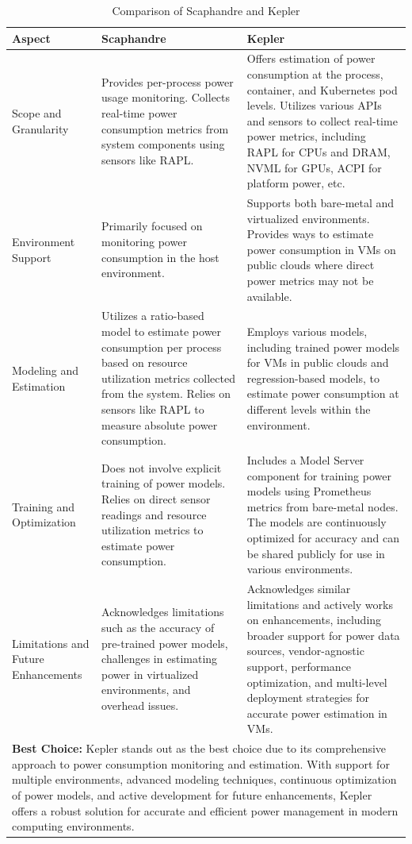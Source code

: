 \begin{table}[htbp]
  \centering
  \begin{tabular}{|p{3cm}|p{6cm}|p{6cm}|}
  \hline
  \textbf{Aspect} & \textbf{Scaphandre} & \textbf{Kepler} \\
  \hline
  Scope and Granularity & Provides per-process power usage monitoring. Collects real-time power consumption metrics from system components using sensors like RAPL. & Offers estimation of power consumption at the process, container, and Kubernetes pod levels. Utilizes various APIs and sensors to collect real-time power metrics, including RAPL for CPUs and DRAM, NVML for GPUs, ACPI for platform power, etc. \\
  \hline
  Environment Support & Primarily focused on monitoring power consumption in the host environment. & Supports both bare-metal and virtualized environments. Provides ways to estimate power consumption in VMs on public clouds where direct power metrics may not be available. \\
  \hline
  Modeling and Estimation & Utilizes a ratio-based model to estimate power consumption per process based on resource utilization metrics collected from the system. Relies on sensors like RAPL to measure absolute power consumption. & Employs various models, including trained power models for VMs in public clouds and regression-based models, to estimate power consumption at different levels within the environment. \\
  \hline
  Training and Optimization & Does not involve explicit training of power models. Relies on direct sensor readings and resource utilization metrics to estimate power consumption. & Includes a Model Server component for training power models using Prometheus metrics from bare-metal nodes. The models are continuously optimized for accuracy and can be shared publicly for use in various environments. \\
  \hline
  Limitations and Future Enhancements & Acknowledges limitations such as the accuracy of pre-trained power models, challenges in estimating power in virtualized environments, and overhead issues. & Acknowledges similar limitations and actively works on enhancements, including broader support for power data sources, vendor-agnostic support, performance optimization, and multi-level deployment strategies for accurate power estimation in VMs. \\
  \hline
  \multicolumn{3}{|p{15cm}|}{\textbf{Best Choice:} Kepler stands out as the best choice due to its comprehensive approach to power consumption monitoring and estimation. With support for multiple environments, advanced modeling techniques, continuous optimization of power models, and active development for future enhancements, Kepler offers a robust solution for accurate and efficient power management in modern computing environments.} \\
  \hline
  \end{tabular}
  \caption{Comparison of Scaphandre and Kepler}
  \label{tab:comparison}
  \end{table}

